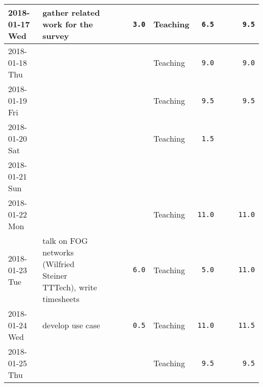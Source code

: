\documentclass[10pt,a4paper,landscape]{article}
\def\tuwBlue{tuwBlue}
\begin{document}
{\begin{tabular}{|l||p{65mm}|c|c|c|r||p{30mm}|r||p{30mm}|r||r|}
    \rowcolor{\tuwBlue!5!white}
    2018-01-17 Wed & gather related work for the survey &  &  &  & \cellcolor{\tuwBlue!20!white} \texttt{3.0} & Teaching & \cellcolor{\tuwBlue!20!white} \texttt{6.5} &  & \cellcolor{\tuwBlue!20!white}  & \cellcolor{\tuwBlue!40!white} \texttt{9.5}
      \\ \hline
    
    \rowcolor{\tuwBlue!5!white}
    2018-01-18 Thu &  &  &  &  & \cellcolor{\tuwBlue!20!white}  & Teaching & \cellcolor{\tuwBlue!20!white} \texttt{9.0} &  & \cellcolor{\tuwBlue!20!white}  & \cellcolor{\tuwBlue!40!white} \texttt{9.0}
      \\ \hline
    
    \rowcolor{\tuwBlue!5!white}
    2018-01-19 Fri &  &  &  &  & \cellcolor{\tuwBlue!20!white}  & Teaching & \cellcolor{\tuwBlue!20!white} \texttt{9.5} &  & \cellcolor{\tuwBlue!20!white}  & \cellcolor{\tuwBlue!40!white} \texttt{9.5}
      \\ \hline
    
    \rowcolor{lightgray}
    2018-01-20 Sat &  &  &  &  &  & Teaching & \texttt{1.5} &  &  & 
      \\ \hline
    
    \rowcolor{lightgray}
    2018-01-21 Sun &  &  &  &  &  &  &  &  &  & 
      \\ \hline
    
    \rowcolor{\tuwBlue!5!white}
    2018-01-22 Mon &  &  &  &  & \cellcolor{\tuwBlue!20!white}  & Teaching & \cellcolor{\tuwBlue!20!white} \texttt{11.0} &  & \cellcolor{\tuwBlue!20!white}  & \cellcolor{\tuwBlue!40!white} \texttt{11.0}
      \\ \hline
    
    \rowcolor{\tuwBlue!5!white}
    2018-01-23 Tue & talk on FOG networks (Wilfried Steiner TTTech), write timesheets &  &  &  & \cellcolor{\tuwBlue!20!white} \texttt{6.0} & Teaching & \cellcolor{\tuwBlue!20!white} \texttt{5.0} &  & \cellcolor{\tuwBlue!20!white}  & \cellcolor{\tuwBlue!40!white} \texttt{11.0}
      \\ \hline
    
    \rowcolor{\tuwBlue!5!white}
    2018-01-24 Wed & develop use case &  &  &  & \cellcolor{\tuwBlue!20!white} \texttt{0.5} & Teaching & \cellcolor{\tuwBlue!20!white} \texttt{11.0} &  & \cellcolor{\tuwBlue!20!white}  & \cellcolor{\tuwBlue!40!white} \texttt{11.5}
      \\ \hline
    
    \rowcolor{\tuwBlue!5!white}
    2018-01-25 Thu &  &  &  &  & \cellcolor{\tuwBlue!20!white}  & Teaching & \cellcolor{\tuwBlue!20!white} \texttt{9.5} &  & \cellcolor{\tuwBlue!20!white}  & \cellcolor{\tuwBlue!40!white} \texttt{9.5}
      \\ \hline
    

\end{tabular}}
\end{document}
